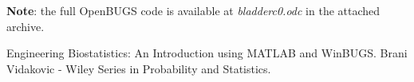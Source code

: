 \documentclass[a4 paper]{article}
\begin{document}
\textbf{Note}: the full OpenBUGS code is available 
at \textit{bladderc0.odc} in the attached archive.




\begin{thebibliography}{9}


\label{stat} 
Engineering Biostatistics: An Introduction using MATLAB and WinBUGS. 
Brani Vidakovic - Wiley Series in Probability and Statistics.

\end{thebibliography}
\end{document}
